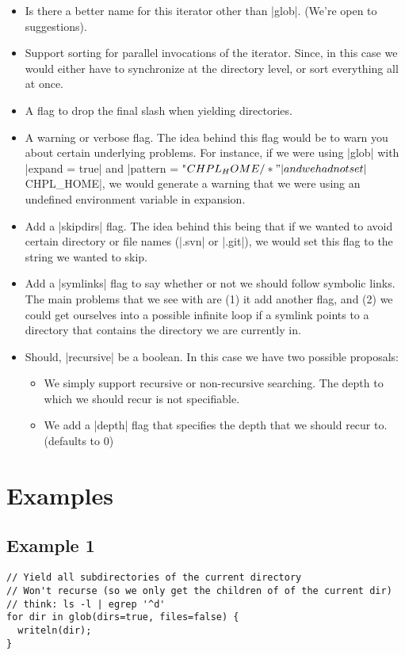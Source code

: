 \documentclass{article}
\begin{document}
\begin{itemize}
\item Is there a better name for this iterator other than |glob|. (We're open to
suggestions).
\item Support sorting for parallel invocations of the iterator. Since, in this case
we would either have to synchronize at the directory level, or sort everything all at
once.
\item A flag to drop the final slash when yielding directories.
\item A warning or verbose flag. The idea behind this flag would be to warn you about
certain underlying problems. For instance, if we were using |glob| with |expand = true|
and  |pattern = "$CHPL_HOME/*"| and we had not set |$CHPL_HOME|, we would generate a
warning that we were using an undefined environment variable in expansion.
\item Add a |skipdirs| flag. The idea behind this being that if we wanted
to avoid certain directory or file names (\eg |.svn| or |.git|), we would set this
flag to the string we wanted to skip.
\item Add a |symlinks| flag to say whether or not we should follow symbolic
links. The main problems that we see with are (1) it add another flag, and (2) we
could get ourselves into a possible infinite loop if a symlink points to a directory
that contains the directory we are currently in.
\item Should, |recursive| be a boolean. In this case we have two possible proposals:
\begin{itemize}
\item We simply support recursive or non-recursive searching. The depth to which we
should recur is not specifiable.
\item We add a |depth| flag that specifies the depth that we should recur to.
(defaults to $0$)
\end{itemize}
\end{itemize}

\section{Examples}\label{s:examples}
\subsection{Example 1}
\begin{lstlisting}
// Yield all subdirectories of the current directory
// Won't recurse (so we only get the children of of the current dir)
// think: ls -l | egrep '^d'
for dir in glob(dirs=true, files=false) {
  writeln(dir);
}
\end{lstlisting}
\end{document}
